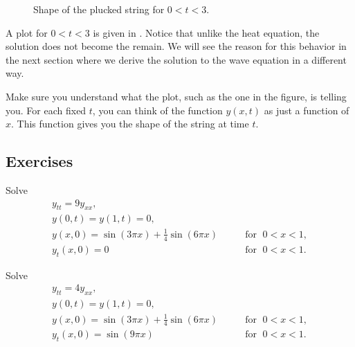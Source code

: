\begin{example}
\begin{figure}[h!t]
\capstart
\begin{center}
\caption{Shape of the plucked string for $0 < t < 3$.\label{wave:pluckedexfig}}
\end{center}
\end{figure}

A plot for $0 < t < 3$ is given in .  Notice
that unlike the heat equation, the solution does not become
the  remain.  We will see the reason for this behavior in the
next section where we derive the solution to the wave equation in a different
way.

Make sure you understand what the plot, such as the one in the figure, is
telling you.  For each fixed $t$, you can think of the function 
$y(x,t)$ as just a function of $x$.  This function gives you the shape of the
string at time $t$.
\end{example}

\subsection{Exercises}

\begin{exercise}
Solve
\begin{equation*}
\begin{array}{ll}
y_{tt} = 9 y_{xx} , &  \\
y(0,t) = y(1,t) = 0 , &  \\
y(x,0) = \sin (3\pi x) + \frac{1}{4} \sin (6 \pi x) & \qquad \text{for } \; 0 < x < 1 , \\
y_t(x,0) = 0 & \qquad \text{for } \; 0 < x < 1 .
\end{array}
\end{equation*}
\end{exercise}

\begin{exercise}
Solve
\begin{equation*}
\begin{array}{ll}
y_{tt} = 4 y_{xx} , &  \\
y(0,t) = y(1,t) = 0 , &  \\
y(x,0) = \sin (3\pi x) + \frac{1}{4} \sin (6 \pi x) & \qquad \text{for } \; 0 < x < 1 , \\
y_t(x,0) = \sin (9 \pi x) & \qquad \text{for } \; 0 < x < 1 .
\end{array}
\end{equation*}
\end{exercise}

